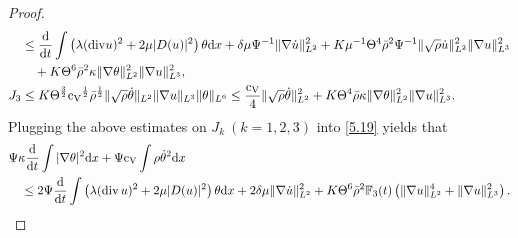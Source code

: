 \documentclass[11pt]{article}
\DeclareMathOperator{\divv}{div}
\newcommand{\na}{\nabla}
\begin{document}
\begin{proof}
\begin{align*}
& \leq \frac{{\rm d}}{{\rm d} t} \int \left(\lambda ({\rm div} u)^2 + 2 \mu |D(u)|^2 \right) \theta {\rm d} x + \delta \mu \Psi^{-1} \|\na \dot{u}\|_{L^2}^2 + K \mu^{-1} \Theta^4 \bar{\rho}^2 \Psi^{-1} \|\sqrt{\rho} \dot{u}\|_{L^2}^2 \|\na u\|_{L^3}^2 \\
& \quad + K \Theta^6 \bar{\rho}^2 \kappa \|\na \theta\|_{L^2}^2 \|\na u\|_{L^3}^2,
\\
J_3 &\leq K \Theta^{\frac{3}{2}} {\rm c_V}^{\frac{1}{2}} \bar{\rho}^{\frac{1}{2}} \|\sqrt{\rho} \dot{\theta}\|_{L^2} \|\na u\|_{L^3} \|\theta\|_{L^6} \leq \frac{{\rm c_V}}{4} \|\sqrt{\rho} \dot{\theta}\|_{L^2}^2 + K \Theta^4 \bar{\rho} \kappa \|\na \theta\|_{L^2}^2 \|\na u\|_{L^3}^2.
\end{align*}
Plugging the above estimates on $J_k\ (k=1,2,3)$ into \eqref{5.19} yields that
\begin{align}
& \Psi \kappa \frac{{\rm d}}{{\rm d} t} \int |\nabla\theta|^2 {\rm d} x + \Psi {\rm c_V} \int \rho \dot{\theta}^2 {\rm d} x \notag\\
&\quad \leq 2 \Psi \frac{{\rm d}}{{\rm d} t} \int \left(\lambda (\divv u)^2 + 2 \mu |D(u)|^2 \right) \theta {\rm d} x + 2 \delta \mu \|\na \dot{u}\|_{L^2}^2 + K \Theta^6 \bar{\rho}^2 \mathbb{F}_3 (t) \left(\|\na u\|_{L^2}^4 + \|\na u\|_{L^3}^2 \right).\label{5.21}
\end{align}


\end{proof}
\end{document}
